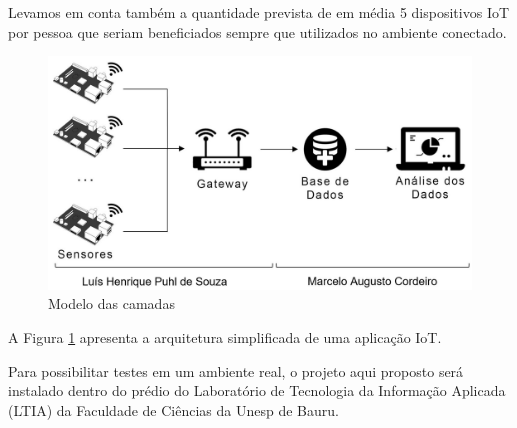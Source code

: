 Levamos em conta também a quantidade prevista de em média 5 dispositivos IoT
por pessoa que seriam beneficiados sempre que utilizados no ambiente conectado.

\begin{figure}[htb]
	\caption{\label{fig:projeto}Modelo das camadas }
	\begin{center}
		\includegraphics[width=1\textwidth]{img/projeto.jpg}
	\end{center}
\end{figure}

A Figura \ref{fig:projeto} apresenta a arquitetura simplificada de uma aplicação
IoT.

Para possibilitar testes em um ambiente real, o projeto aqui proposto será
instalado dentro do prédio do Laboratório de Tecnologia da Informação Aplicada
(LTIA) da Faculdade de Ciências da Unesp de Bauru.
